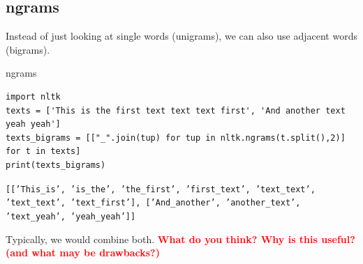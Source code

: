 \documentclass[handout]{beamer}
\begin{document}


\subsection{ngrams}
\begin{frame}
Instead of just looking at single words (unigrams), we can also use adjacent words (bigrams).
\end{frame}

\begin{frame}[fragile]{ngrams}
\begin{lstlisting}
import nltk
texts = ['This is the first text text text first', 'And another text yeah yeah']
texts_bigrams = [["_".join(tup) for tup in nltk.ngrams(t.split(),2)] for t in texts]
print(texts_bigrams)
\end{lstlisting}
\texttt{[['This\_is',
'is\_the',
'the\_first',
'first\_text',
'text\_text',
'text\_text',
'text\_first'],
['And\_another', 'another\_text', 'text\_yeah', 'yeah\_yeah']]
}

Typically, we would combine both.
\pause
\textbf{\textcolor{red}{What do you think? Why is this useful? (and what may be drawbacks?)}}
\end{frame}
\end{document}
